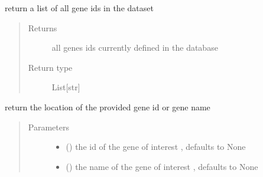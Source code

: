 \documentclass[letterpaper,10pt,english]{sphinxmanual}
\begin{document}
\begin{fulllineitems}
\begin{fulllineitems}
\label{\detokenize{IPTK.Classes:IPTK.Classes.Database.CellularLocationDB.get_genes}}
return a list of all gene ids in the dataset
\begin{quote}\begin{description}
\item[{Returns}] \leavevmode
all genes ids currently defined in the database

\item[{Return type}] \leavevmode
List{[}str{]}

\end{description}\end{quote}

\end{fulllineitems}


\begin{fulllineitems}
\label{\detokenize{IPTK.Classes:IPTK.Classes.Database.CellularLocationDB.get_go_names}}
return the location of the provided gene id or gene name
\begin{quote}\begin{description}
\item[{Parameters}] \leavevmode\begin{itemize}
\item {} 
 (\sphinxstyleliteralemphasis{\sphinxupquote{, }}) \textendash{} the id of the gene of interest , defaults to None

\item {} 
 (\sphinxstyleliteralemphasis{\sphinxupquote{{[}}}\sphinxstyleliteralemphasis{\sphinxupquote{{]}}}\sphinxstyleliteralemphasis{\sphinxupquote{, }}) \textendash{} the name of the gene of interest , defaults to None


\end{itemize}
\end{description}
\end{quote}
\end{fulllineitems}
\end{fulllineitems}
\end{document}
